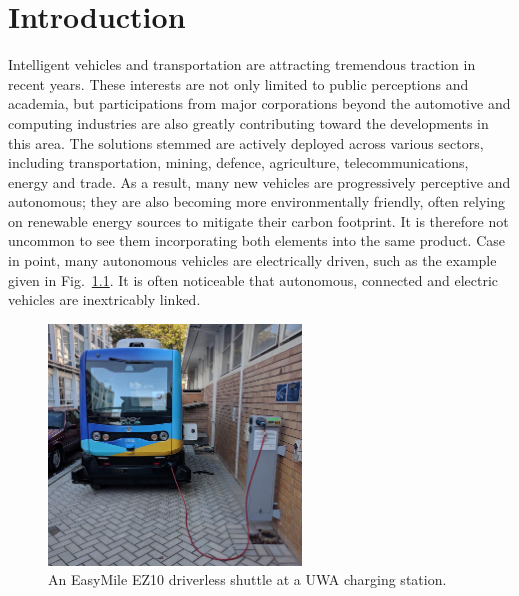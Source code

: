 \chapter{Introduction}

\ifpdf
\graphicspath{{Chapter1/Figs/Raster/}{Chapter1/Figs/PDF/}{Chapter1/Figs/}}
\else
\graphicspath{{Chapter1/Figs/Vector/}{Chapter1/Figs/}}
\fi


Intelligent vehicles and transportation are attracting tremendous traction in recent years. These interests are not only limited to public perceptions and academia, but participations from major corporations beyond the automotive and computing industries are also greatly contributing toward the developments in this area. The solutions stemmed are actively deployed across various sectors, including transportation, mining, defence, agriculture, telecommunications, energy and trade. As a result, many new vehicles are progressively perceptive and autonomous; they are also becoming more environmentally friendly, often relying on renewable energy sources to mitigate their carbon footprint. It is therefore not uncommon to see them incorporating both elements into the same product. Case in point, many autonomous vehicles are electrically driven, such as the example given in Fig.~\ref{fig:1:bus}. It is often noticeable that autonomous, connected and electric vehicles are inextricably linked.

\begin{figure}[ht] 
	\centering    
	\includegraphics[width=0.6\textwidth]{bus}
	\caption{An EasyMile EZ10 driverless shuttle at a UWA charging station.}
	\label{fig:1:bus}
\end{figure}

